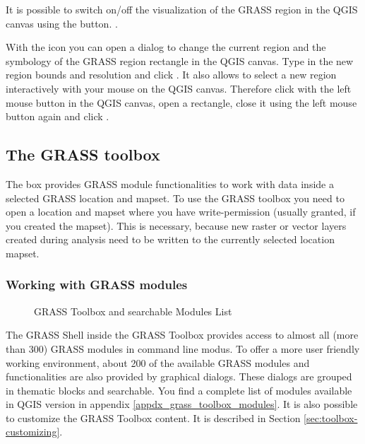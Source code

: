 It is possible to switch on/off the visualization of the GRASS region in the
QGIS canvas using the 
button. .

With the  icon you 
can open a dialog to change the current region and the symbology of the GRASS region rectangle in the QGIS canvas. Type in the new region bounds and 
resolution and click . It also allows to select a new region interactively with your mouse on the QGIS canvas. Therefore click with the left mouse button in the QGIS canvas, open a rectangle, close it using the left mouse button again and click . 

\subsection{The GRASS toolbox}\label{subsec:grass_toolbox}

The  box provides GRASS 
module functionalities to work with data inside a selected GRASS location 
and mapset. To use the GRASS toolbox you need to open a location and mapset where 
you have write-permission (usually granted, if you created the mapset). This is 
necessary, because new raster or vector layers created during analysis need to 
be written to the currently selected location mapset.

\subsubsection{Working with GRASS modules}

\begin{figure}[h]
\centering
\caption{GRASS Toolbox and searchable Modules List \nixcaption}\label{fig:grass_modules}
   \goodgap
\end{figure}

The GRASS Shell inside the GRASS Toolbox provides access to almost all (more 
than 300) GRASS modules in command line modus. To offer a more user
friendly working environment, about 200 of the available GRASS modules and 
functionalities are also provided by graphical dialogs. These dialogs are 
grouped in thematic blocks and searchable. You find a complete list of modules 
available in QGIS version \CURRENT in appendix \ref{appdx_grass_toolbox_modules}. 
It is also possible to customize the GRASS Toolbox content. It is described in 
Section \ref{sec:toolbox-customizing}.


